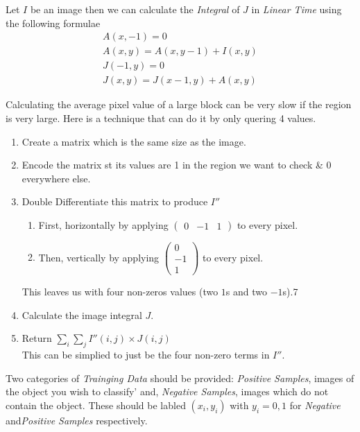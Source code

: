 \documentclass[11pt,a4paper]{article}
\begin{document}
Let $I$ be an image then we can calculate the \textit{Integral} of $J$ in \textit{Linear Time} using the following formulae
\[\begin{array}{l}
A(x,-1)=0\\
A(x,y)=A(x,y-1)+I(x,y)\\
J(-1,y)=0\\
J(x,y)=J(x-1,y)+A(x,y)
\end{array}\]


Calculating the average pixel value of a large block can be very slow if the region is very large. Here is a technique that can do it by only quering 4 values.
\begin{enumerate}[label=\roman*)]
	\item Create a matrix which is the same size as the image.
	\item Encode the matrix st its values are 1 in the region we want to check \& 0 everywhere else.
	\item Double Differentiate this matrix to produce $I''$
	\begin{enumerate}
		\item First, horizontally by applying $\begin{pmatrix}0&-1&1\end{pmatrix}$ to every pixel.
		\item Then, vertically by applying $\begin{pmatrix}0\\-1\\1\end{pmatrix}$ to every pixel.
	\end{enumerate}
	This leaves us with four non-zeros values (two $1$s and two $-1$s).7
	\item Calculate the image integral $J$.
	\item Return $\sum_i\sum_j I''(i,j)\times J(i,j)$\\
	\nb This can be simplied to just be the four non-zero terms in $I''$.
\end{enumerate}

Two categories of \textit{Trainging Data} should be provided: \textit{Positive Samples}, images of the object you wish to classify' and, \textit{Negative Samples}, images which do not contain the object. These should be labled $(x_i,y_i)$ with $y_i=0,1$ for \textit{Negative} and\textit{Positive Samples} respectively.\\
\end{document}
